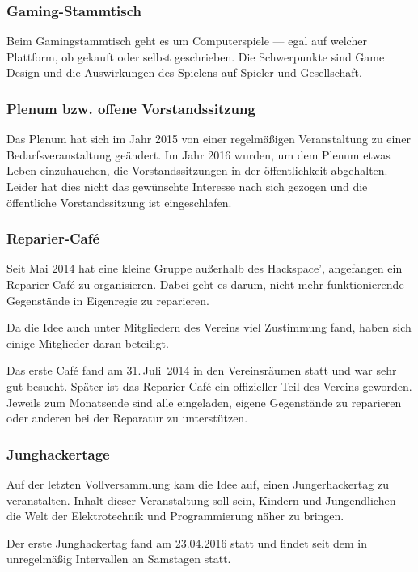 \documentclass[ngerman]{scrartcl}
\begin{document}
\subsubsection{Gaming-Stammtisch}

Beim Gamingstammtisch geht es um Computerspiele — egal auf welcher
Plattform, ob gekauft oder selbst geschrieben. Die Schwerpunkte sind
Game Design und die Auswirkungen des Spielens auf Spieler und
Gesellschaft.

\subsubsection{Plenum bzw. offene Vorstandssitzung}

Das Plenum hat sich im Jahr 2015 von einer regelmäßigen Veranstaltung
zu einer Bedarfsveranstaltung geändert. Im Jahr 2016 wurden, um dem
Plenum etwas Leben einzuhauchen, die Vorstandssitzungen in der
öffentlichkeit abgehalten. Leider hat dies nicht das gewünschte
Interesse nach sich gezogen und die öffentliche Vorstandssitzung ist
eingeschlafen.

\subsubsection{Reparier-Café}

Seit Mai 2014 hat eine kleine Gruppe außerhalb des Hackspace',
angefangen ein Reparier-Café zu organisieren. Dabei geht es darum,
nicht mehr funktionierende Gegenstände in Eigenregie zu reparieren.

Da die Idee auch unter Mitgliedern des Vereins viel Zustimmung fand,
haben sich einige Mitglieder daran beteiligt.

Das erste Café fand am 31.\,Juli~2014 in den Vereinsräumen statt und
war sehr gut besucht.  Später ist das Reparier-Café ein offizieller
Teil des Vereins geworden. Jeweils zum Monatsende sind alle
eingeladen, eigene Gegenstände zu reparieren oder anderen bei der
Reparatur zu unterstützen.

\subsubsection{Junghackertage}

Auf der letzten Vollversammlung kam die Idee auf, einen
Jungerhackertag zu veranstalten. Inhalt dieser Veranstaltung soll
sein, Kindern und Jungendlichen die Welt der Elektrotechnik und
Programmierung näher zu bringen.

Der erste Junghackertag fand am 23.04.2016 statt und findet seit dem in
unregelmäßig Intervallen an Samstagen statt.
\end{document}

